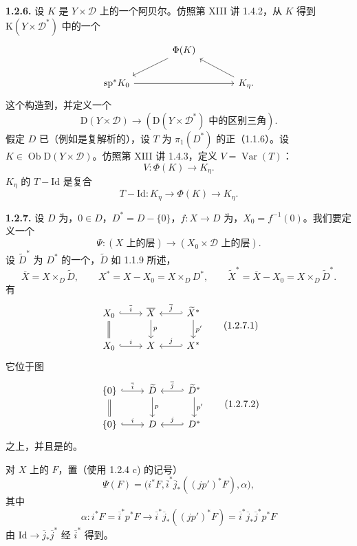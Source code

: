\textbf{1.2.6.} 设 $K$ 是 $Y\times\mathscr D$ 上的一个阿贝尔。仿照第 XIII 讲 1.4.2，从 $K$ 得到 $\mathrm K(Y\times\mathscr D^*)$ 中的一个
\[
\begin{tikzcd}[column sep=large]
&\Phi(K)\arrow[dl]&\\
\mathrm{sp}^*K_0\arrow[rr]&&K_\eta\arrow[ul].
\end{tikzcd}
\]
这个构造到，并定义一个
\[
 \mathrm D(Y\times\mathscr D)\longrightarrow
 (\mathrm D(Y\times\mathscr D^*)\text{ 中的区别三角}).
\]
假定 $D$ 已（例如是复解析的），设 $T$ 为 $\pi_1(D^*)$ 的正（1.1.6）。设 $K\in\operatorname{Ob}\mathrm D(Y\times\mathscr D)$。仿照第 XIII 讲 1.4.3，定义 $V=\operatorname{Var}(T)$：
\[
 V:\Phi(K)\longrightarrow K_\eta.
\]
$K_\eta$ 的 $T-\mathrm{Id}$ 是复合
\[
 T-\mathrm{Id}:K_\eta\longrightarrow\Phi(K)\longrightarrow K_\eta.
\]

\textbf{1.2.7.} 设 $D$ 为，$0\in D$，$D^*=D-\{0\}$，$f:X\to D$ 为，$X_0=f^{-1}(0)$。我们要定义一个
\[
 \Psi:(X\text{ 上的层})\longrightarrow(X_0\times\mathscr D\text{ 上的层}).
\]
设 $\widetilde D^*$ 为 $D^*$ 的一个，$\widetilde D$ 如 1.1.9 所述，
\[
 \overline X=X\times_D\widetilde D,\qquad
 X^*=X-X_0=X\times_D D^*,\qquad
 \widetilde X^*=\overline X-X_0=X\times_D\widetilde D^*.
\]
有
\[
\begin{tikzcd}
X_0\arrow[r,hook,"\overline i"]\arrow[d,equal]&\overline X\arrow[d,"p"]&\widetilde X^*\arrow[l,hook',"\overline j"']\arrow[d,"p'"]\\
X_0\arrow[r,hook,"i"]&X&X^*\arrow[l,hook',"j"']
\end{tikzcd}\tag{1.2.7.1}
\]
它位于图
\[
\begin{tikzcd}
\{0\}\arrow[r,hook,"\overline i"]\arrow[d,equal]&\widetilde D\arrow[d,"p"]&\widetilde D^*\arrow[l,hook',"\overline j"']\arrow[d,"p'"]\\
\{0\}\arrow[r,hook,"i"]&D&D^*\arrow[l,hook',"j"']
\end{tikzcd}\tag{1.2.7.2}
\]
之上，并且是的。

对 $X$ 上的 $F$，置（使用 1.2.4 c) 的记号）
\[
 \Psi(F)=\bigl(i^*F,\overline i^*\overline j_*((jp')^*F),\alpha\bigr),
\]
其中
\[
 \alpha:i^*F=\overline i^*p^*F\longrightarrow
 \overline i^*\overline j_*((jp')^*F)
 =\overline i^*\overline j_*\overline j^*p^*F
\]
由 $\mathrm{Id}\to\overline j_*\overline j^*$ 经 $\overline i^*$ 得到。

